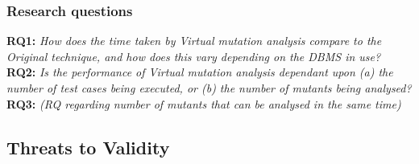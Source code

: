 		\subsubsection{Research questions}

			\textbf{RQ1: }\emph{How does the time taken by Virtual mutation analysis compare to the Original technique, and how does this vary depending on the DBMS in use?}\\


			\textbf{RQ2: }\emph{Is the performance of Virtual mutation analysis dependant upon (a) the number of test cases being executed, or (b) the number of mutants being analysed?}\\


			\textbf{RQ3: }\emph{(RQ regarding number of mutants that can be analysed in the same time)}\\


		

	\subsection{Threats to Validity}
